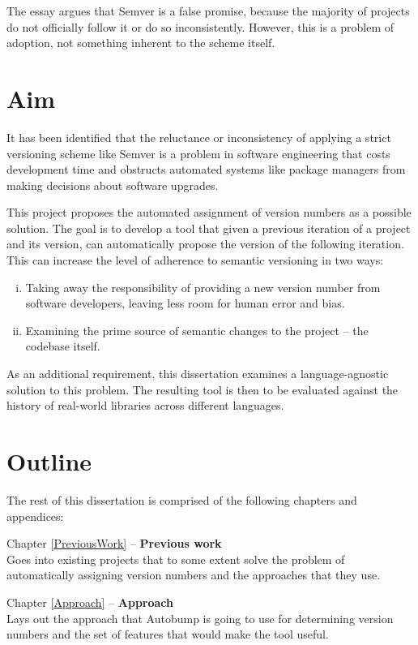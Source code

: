 \documentclass{l4proj}
\begin{document}
The essay argues that Semver is a false promise, because the majority
of projects do not officially follow it or do so inconsistently.
However, this is a problem of adoption, not something inherent to the
scheme itself.

\clearpage
\section{Aim}

It has been identified that the reluctance or inconsistency of
applying a strict versioning scheme like Semver is a problem in
software engineering that costs development time and obstructs
automated systems like package managers from making decisions about
software upgrades.

This project proposes the automated assignment of version numbers
as a possible solution. The goal is to develop a tool that given a
previous iteration of a project and its version, can automatically
propose the version of the following iteration. This can increase the
level of adherence to semantic versioning in two ways:

\begin{enumerate}[(i)]
\item Taking away the responsibility of providing a new version number
from software developers, leaving less room for human error and bias.
\item Examining the prime source of semantic changes to the project --
the codebase itself.
\end{enumerate}

As an additional requirement, this dissertation examines a
language-agnostic solution to this problem. The resulting tool is then
to be evaluated against the history of real-world libraries across
different languages.

\section{Outline}

The rest of this dissertation is comprised of the following chapters
and appendices:

\noindent Chapter \ref{PreviousWork} -- \textbf{Previous work} \\
Goes into existing projects that to some extent solve the problem
of automatically assigning version numbers and the approaches that
they use.

\noindent Chapter \ref{Approach} -- \textbf{Approach} \\
Lays out the approach that Autobump is going to use for
determining version numbers and the set of features that would make
the tool useful.
\end{document}
